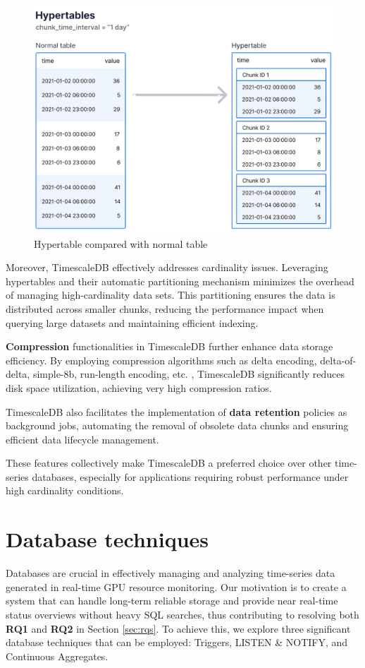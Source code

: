 \begin{figure}[H]
\centering
\includegraphics[width=1\textwidth]{figures/hypertables-chunks.png}
\caption{Hypertable compared with normal table \cite{hypertables}}
\label{fig:hypertables-chunks}
\end{figure}

Moreover, TimescaleDB effectively addresses cardinality issues. Leveraging hypertables and their automatic partitioning mechanism minimizes the overhead of managing high-cardinality data sets. This partitioning ensures the data is distributed across smaller chunks, reducing the performance impact when querying large datasets and maintaining efficient indexing.

\textbf{Compression} functionalities in TimescaleDB further enhance data storage efficiency. By employing compression algorithms such as delta encoding, delta-of-delta, simple-8b, run-length encoding, etc. \cite{timescaledb-compress}, TimescaleDB significantly reduces disk space utilization, achieving very high compression ratios.

TimescaleDB also facilitates the implementation of \textbf{data retention} policies as background jobs, automating the removal of obsolete data chunks and ensuring efficient data lifecycle management.

These features collectively make TimescaleDB a preferred choice over other time-series databases, especially for applications requiring robust performance under high cardinality conditions.

\section{Database techniques}
Databases are crucial in effectively managing and analyzing time-series data generated in real-time GPU resource monitoring. Our motivation is to create a system that can handle long-term reliable storage and provide near real-time status overviews without heavy SQL searches, thus contributing to resolving both \textbf{RQ1} and \textbf{RQ2} in Section \ref{sec:rqs}. To achieve this, we explore three significant database techniques that can be employed: Triggers, LISTEN \& NOTIFY, and Continuous Aggregates.

